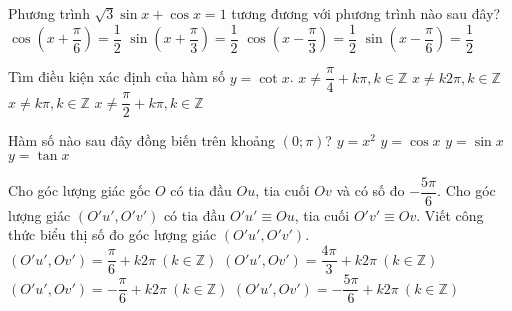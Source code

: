 \begin{ex}%
	Phương trình $\sqrt{3}\sin x+\cos x=1$ tương đương với phương trình nào sau đây?
	\choice
	{$\cos \left( x+\dfrac{\pi}{6}\right) =\dfrac{1}{2}$}
	{$\sin \left( x+\dfrac{\pi}{3}\right) =\dfrac{1}{2}$}
	{\True $\cos \left( x-\dfrac{\pi}{3}\right) =\dfrac{1}{2}$}
	{$\sin \left( x-\dfrac{\pi}{6}\right) =\dfrac{1}{2}$}
\end{ex}

\begin{ex}%
	Tìm điều kiện xác định của hàm số  $y=\cot x$.
	\choice
	{$x \neq \dfrac{\pi}{4}+k \pi, k \in \mathbb{Z}$}
	{ $x \neq k 2 \pi, k \in \mathbb{Z}$}
	{\True $x \neq k \pi, k \in \mathbb{Z}$}
	{$x\neq \dfrac{\pi}{2}+k \pi, k \in \mathbb{Z}$}
\end{ex}

\begin{ex}%
	Hàm số nào sau đây đồng biến trên khoảng $(0;\pi)$?
	\choice
	{\True $y=x^2$}
	{$y=\cos x$}
	{$y=\sin x$}
	{$y=\tan x$}
\end{ex}

\begin{ex}%
	Cho góc lượng giác gốc $O$ có tia đầu $Ou$, tia cuối $Ov$ và có số đo $-\dfrac{5\pi}{6}$. Cho góc lượng giác $(O'u',O'v')$ có tia đầu $O'u'\equiv Ou$, tia cuối $O'v'\equiv Ov$. Viết công thức biểu thị số đo góc lượng giác $(O'u',O'v')$.
	\choice
	{$(O'u',Ov')=\dfrac{\pi}{6}+k2\pi\ (k\in \mathbb{Z})$}
	{$(O'u',Ov')=\dfrac{4\pi}{3}+k2\pi\ (k\in \mathbb{Z})$}
	{$(O'u',Ov')=-\dfrac{\pi}{6}+k2\pi\ (k\in \mathbb{Z})$}
	{\True $(O'u',Ov')=-\dfrac{5\pi}{6}+k2\pi\ (k\in \mathbb{Z})$}
\end{ex}

